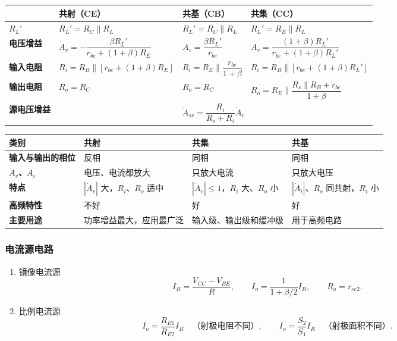 \documentclass[UTF8,fontset=fandol,zihao=5]{ctexart}
\newcommand{\parallelsum}{\mathbin{\|}}
\begin{document}
\begin{center}
\scriptsize
\renewcommand{\arraystretch}{1.5}
\begin{tabularx}{\textwidth}{>{\bfseries}p{1.7cm}XXX}
\toprule
 & 共射（CE） & 共基（CB） & 共集（CC） \\
\midrule
$R_L'$ & $R_L'=R_C\parallelsum R_L$ & $R_L'=R_C\parallelsum R_L$ & $R_L'=R_E\parallelsum R_L$ \\
电压增益 & $\dot A_v=-\dfrac{\beta R_L'}{r_{be}+(1+\beta)R_E}$ & $\dot A_v=\dfrac{\beta R_L'}{r_{be}}$ & $\dot A_v=\dfrac{(1+\beta)R_L'}{r_{be}+(1+\beta)R_L'}$ \\
输入电阻 & $R_i=R_B\parallelsum[r_{be}+(1+\beta)R_E]$ & $R_i=R_E\parallelsum\dfrac{r_{be}}{1+\beta}$ & $R_i=R_B\parallelsum[r_{be}+(1+\beta)R_L']$ \\
输出电阻 & $R_o=R_C$ & $R_o=R_C$ & $R_o=R_E\parallelsum\dfrac{R_s\parallelsum R_B+r_{be}}{1+\beta}$ \\
源电压增益 & \multicolumn{3}{c}{$\dot A_{sv}=\dfrac{R_i}{R_s+R_i}\dot A_v$} \\
\bottomrule
\end{tabularx}
\end{center}

\begin{center}
\renewcommand{\arraystretch}{1.35}
\begin{tabularx}{0.94\textwidth}{>{\bfseries}p{2.4cm}XXX}
\toprule
类别 & 共射 & 共集 & 共基 \\
\midrule
输入与输出的相位 & 反相 & 同相 & 同相 \\
$\dot A_v$、$\dot A_i$ & 电压、电流都放大 & 只放大电流 & 只放大电压 \\
特点 & $|\dot A_v|$ 大，$R_i$、$R_o$ 适中 & $|\dot A_v|\leq1$，$R_i$ 大、$R_o$ 小 & $|\dot A_i|$、$R_o$ 同共射，$R_i$ 小 \\
高频特性 & 不好 & 好 & 好 \\
主要用途 & 功率增益最大，应用最广泛 & 输入级、输出级和缓冲级 & 用于高频电路 \\
\bottomrule
\end{tabularx}
\end{center}

\subsubsection{电流源电路}

\begin{enumerate}
  \item 镜像电流源
  \[
    I_R=\frac{V_{CC}-V_{BE}}{R},
    \qquad
    I_o=\frac{1}{1+\beta/2}I_R,
    \qquad
    R_o=r_{ce2}.
  \]
  \item 比例电流源
  \[
    I_o=\frac{R_{E1}}{R_{E2}}I_R\quad\text{（射极电阻不同）},
    \qquad
    I_o=\frac{S_2}{S_1}I_R\quad\text{（射极面积不同）}.
  \]
\end{enumerate}
\end{document}

